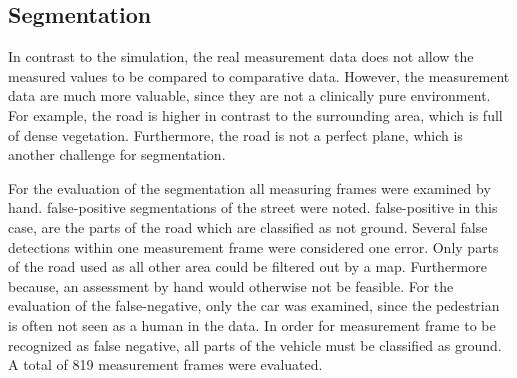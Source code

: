 \documentclass[11pt,oneside,openright]{mpreport}
\begin{document}
\subsection{Segmentation}


In contrast to the simulation, the real measurement data does not allow the measured values to be compared to comparative data. 
However, the measurement data are much more valuable, since they are not a clinically pure environment.
For example, the road is higher in contrast to the surrounding area, which is full of dense vegetation. 
Furthermore, the road is not a perfect plane, which is another challenge for segmentation.


For the evaluation of the segmentation all measuring frames were examined by hand. 
false-positive segmentations of the street were noted. false-positive in this case, are the parts of the road which are classified as not ground. 
Several false detections within one measurement frame were considered one error.
Only parts of the road used as all other area could be filtered out by a map. 
Furthermore because, an assessment by hand would otherwise not be feasible.
For the evaluation of the false-negative, only the car was examined, since the pedestrian is often not seen as a human in the data. 
In order for measurement frame to be recognized as false negative, all parts of the vehicle must be classified as ground. 
A total of 819 measurement frames were evaluated.
\end{document}
